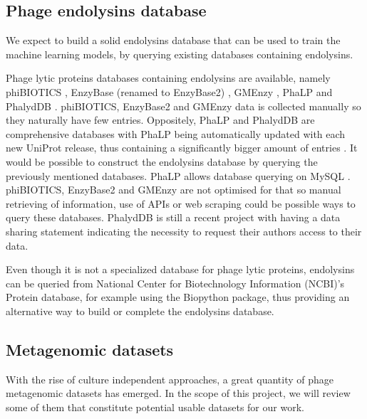 \documentclass[runningheads]{llncs}
\begin{document}
\subsection{Phage endolysins database}
We expect to build a solid endolysins database that can be used to train the machine learning models, by querying existing databases containing endolysins.

Phage lytic proteins databases containing endolysins are available, namely phiBIOTICS \cite{Hojckova2013}, EnzyBase (renamed to EnzyBase2) \cite{Wu2012}, GMEnzy \cite{Wu2014}, PhaLP \cite{Criel2021} and PhalydDB \cite{Gou2022}.
phiBIOTICS, EnzyBase2 and GMEnzy data is collected manually so they naturally have few entries. Oppositely, PhaLP and PhalydDB are comprehensive databases with PhaLP being automatically updated with each new UniProt release, thus containing a significantly bigger amount of entries \cite{Criel2021} \cite{Gou2022}.
It would be possible to construct the endolysins database by querying the previously mentioned databases. PhaLP allows database querying on MySQL \cite{Criel2021}. phiBIOTICS, EnzyBase2 and GMEnzy are not optimised for that so manual retrieving of information, use of APIs or web scraping could be possible ways to query these databases. PhalydDB is still a recent project with \cite{Gou2022} having a data sharing statement indicating the necessity to request their authors access to their data.

Even though it is not a specialized database for phage lytic proteins, endolysins can be queried from National Center for Biotechnology Information (NCBI)’s Protein database, for example using the Biopython package, thus providing an alternative way to build or complete the endolysins database.
%
\subsection{Metagenomic datasets}
With the rise of culture independent approaches, a great quantity of phage metagenomic datasets has emerged. In the scope of this project, we will review some of them that constitute potential usable datasets for our work.
\end{document}

